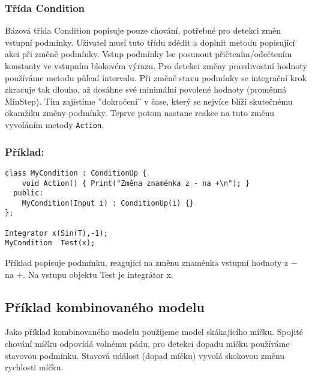 \documentclass[a4paper]{article}
\begin{document}
\subsubsection{Třída Condition}

Bázová třída Condition popisuje pouze chování, potřebné pro
detekci změn vstupní podmínky. Uživatel musí tuto třídu zdědit
a doplnit metodu popisující
akci při změně podmínky. Vstup podmínky lse posunout přičtením/odečtením
konstanty ve vstupním blokovém výrazu.
Pro detekci změny pravdivostní
hodnoty používáme metodu půlení intervalu. Při změně stavu
podmínky se integrační krok zkracuje tak dlouho, až dosáhne své
minimální povolené hodnoty (proměnná MinStep). Tím zajistíme
''dokročení'' v čase, který se nejvíce blíží skutečnému okamžiku
změny podmínky. Teprve potom nastane reakce na tuto změnu
vyvoláním metody \texttt{Action}.

\subsubsection*{Příklad:}

\begin{verbatim}
class MyCondition : ConditionUp {
    void Action() { Print("Změna znaménka z - na +\n"); }
  public:
    MyCondition(Input i) : ConditionUp(i) {}
};

Integrator x(Sin(T),-1);
MyCondition  Test(x);
\end{verbatim}

Příklad popisuje podmínku, reagující na změnu znaménka vstupní
hodnoty z $-$ na $+$. Na vstupu objektu Test je integrátor x.


\subsection{Příklad kombinovaného modelu}

Jako příklad kombinovaného modelu použijeme model skákajícího
míčku. Spojité chování míčku odpovídá volnému pádu, pro detekci
dopadu míčku používáme stavovou podmínku. Stavová událost (dopad
míčku) vyvolá skokovou změnu rychlosti míčku.
\end{document}
